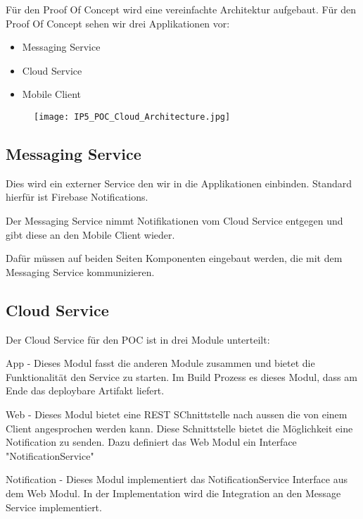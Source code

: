 Für den Proof Of Concept wird eine vereinfachte Architektur aufgebaut. Für den Proof Of Concept sehen wir drei Applikationen vor: 

\begin{itemize}
    \item Messaging Service
    \item Cloud Service
    \item Mobile Client
\end{itemize}


\begin{figure}[H]
\centering
\texttt{[image: IP5\_POC\_Cloud\_Architecture.jpg]}
\end{figure}




\subsection{Messaging Service}

Dies wird ein externer Service den wir in die Applikationen einbinden. Standard hierfür ist Firebase Notifications. 

Der Messaging Service nimmt Notifikationen vom Cloud Service entgegen und gibt diese an den Mobile Client wieder. 

Dafür müssen auf beiden Seiten Komponenten eingebaut werden, die mit dem Messaging Service kommunizieren. 



\subsection{Cloud Service}

Der Cloud Service für den POC ist in drei Module unterteilt: 

App - Dieses Modul fasst die anderen Module zusammen und bietet die Funktionalität den Service zu starten. Im Build Prozess es dieses Modul, dass am Ende das deploybare Artifakt liefert. 

Web - Dieses Modul bietet eine REST SChnittstelle nach aussen die von einem Client angesprochen werden kann. Diese Schnittstelle bietet die Möglichkeit eine Notification zu senden. Dazu definiert das Web Modul ein Interface "NotificationService"

Notification - Dieses Modul implementiert das NotificationService Interface aus dem Web Modul. In der Implementation wird die Integration an den Message Service implementiert. 





